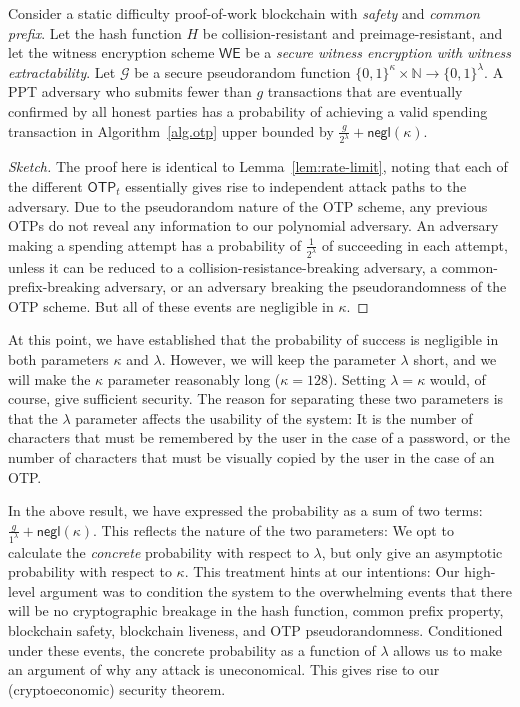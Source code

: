 \begin{lemma}\label{lem:rate-limit-otp}
  Consider a static difficulty proof-of-work
  blockchain with \emph{safety} and \emph{common prefix}.
  Let the hash function $H$ be collision-resistant and preimage-resistant, and let
  the witness encryption scheme $\textsf{WE}$ be a \emph{secure witness encryption with witness extractability}.
  Let $\mathcal{G}$ be a secure pseudorandom function
  $\{0, 1\}^\kappa \times \mathbb{N} \longrightarrow \{0, 1\}^\lambda$.
  A PPT adversary who submits fewer than $g$ transactions that are
  eventually confirmed by all honest parties has a probability of
  achieving a valid spending transaction in Algorithm~\ref{alg.otp}
  upper bounded by $\frac{g}{2^\lambda} + \textsf{negl}(\kappa)$.
\end{lemma}
\begin{proof}[Sketch]
  The proof here is identical to Lemma~\ref{lem:rate-limit},
  noting that each of the different $\textsf{OTP}_t$
  essentially gives rise to independent attack paths to the adversary.
  Due to the pseudorandom nature of the OTP scheme, any previous OTPs
  do not reveal any information to our polynomial adversary.
  An adversary making a spending attempt has
  a probability of $\frac{1}{2^\lambda}$ of succeeding in each attempt,
  unless it can be reduced to a collision-resistance-breaking adversary,
  a common-prefix-breaking adversary, or an adversary breaking the
  pseudorandomness of the OTP scheme. But all of these events are negligible
  in $\kappa$.
\end{proof}

At this point, we have established that the probability of success is negligible
in both parameters $\kappa$ and $\lambda$. However, we will keep the parameter $\lambda$
short, and we will make the $\kappa$ parameter reasonably long ($\kappa = 128$).
Setting $\lambda = \kappa$ would, of course, give sufficient security. The reason
for separating these two parameters is that the $\lambda$ parameter affects the usability
of the system: It is the number of characters that must be remembered by the user
in the case of a password, or the number of characters that must be visually copied
by the user in the case of an OTP.

In the above result, we have expressed the probability as a sum of two terms:
$\frac{g}{1^\lambda} + \textsf{negl}(\kappa)$. This reflects the nature of the
two parameters: We opt to calculate the \emph{concrete} probability with respect
to $\lambda$, but only give an asymptotic probability with respect to $\kappa$.
This treatment hints at our intentions: Our high-level argument was to condition
the system to the overwhelming events that there will be no cryptographic breakage
in the hash function, common prefix property, blockchain safety, blockchain liveness,
and OTP pseudorandomness. Conditioned under these events, the concrete probability as
a function of $\lambda$
allows us to make an argument of why any attack is uneconomical. This
gives rise to our (cryptoeconomic) security theorem.

